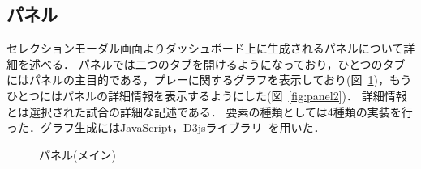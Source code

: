 \documentclass[sotsuron]{kuee}
\begin{document}
		\subsection{パネル}
			セレクションモーダル画面よりダッシュボード上に生成されるパネルについて詳細を述べる．
			パネルでは二つのタブを開けるようになっており，ひとつのタブにはパネルの主目的である，プレーに関するグラフを表示しており(図~\ref{fig:panel1})，もうひとつにはパネルの詳細情報を表示するようにした(図~\ref{fig:panel2})．
			詳細情報とは選択された試合の詳細な記述である．
			要素の種類としては4種類の実装を行った．グラフ生成にはJavaScript，D3jsライブラリ~\cite{D3}を用いた．
				\begin{figure}
					\begin{center}
					\end{center}
					\caption{パネル(メイン)}
			  		\label{fig:panel1}
				\end{figure}
\end{document}
